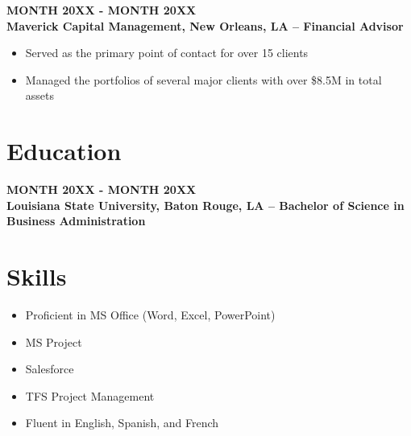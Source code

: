 \documentclass[11pt]{article}
\begin{document}
\textbf{\uppercase{MONTH 20XX - MONTH 20XX}} \\
\textbf{Maverick Capital Management, New Orleans, LA – Financial Advisor}
\begin{itemize}
    \item Served as the primary point of contact for over 15 clients
    \item Managed the portfolios of several major clients with over \$8.5M in total assets
\end{itemize}

\section*{Education}
\textbf{\uppercase{MONTH 20XX - MONTH 20XX}} \\
\textbf{Louisiana State University, Baton Rouge, LA – Bachelor of Science in Business Administration}

\section*{Skills}
\begin{itemize}
    \item Proficient in MS Office (Word, Excel, PowerPoint)
    \item MS Project
    \item Salesforce
    \item TFS Project Management
    \item Fluent in English, Spanish, and French
\end{itemize}
\end{document}
